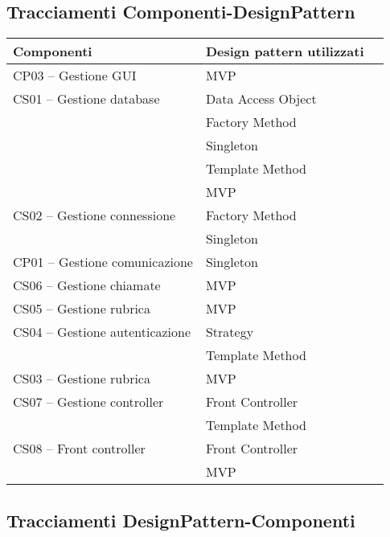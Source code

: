 \subsection{Tracciamenti Componenti-DesignPattern}\label{sec:tracCompDp}

\begin{center}
\begin{longtable}{lp{}l}
\toprule Componenti & Design pattern utilizzati\\
\midrule
CP03 -- Gestione GUI & MVP \\
CS01 -- Gestione database & Data Access Object \\
& Factory Method\\
& Singleton \\
& Template Method\\
& MVP \\
CS02 -- Gestione connessione & Factory Method \\
 & Singleton \\
CP01 -- Gestione comunicazione & Singleton \\
CS06 -- Gestione chiamate & MVP \\
CS05 -- Gestione rubrica & MVP \\
CS04 -- Gestione autenticazione & Strategy \\
& Template Method\\
CS03 -- Gestione rubrica & MVP \\
CS07 -- Gestione controller & Front Controller \\
& Template Method\\
CS08 -- Front controller & Front Controller\\
& MVP \\
\bottomrule
\end{longtable}
\end{center}
\subsection{Tracciamenti DesignPattern-Componenti}\label{sec:tracDpComp}

